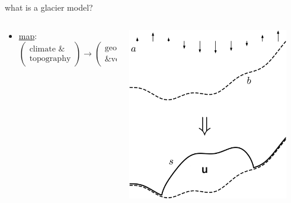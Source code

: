 \documentclass[svgnames,
               hyperref={colorlinks,citecolor=DeepPink4,linkcolor=FireBrick,urlcolor=Maroon},
               usepdftitle=false]  %
               {beamer}
\begin{document}
\begin{frame}{what is a glacier model?}
\begin{columns}
\begin{column}{0.6\textwidth}
\begin{itemize}
\smallskip
\item<2> {\small \underline{map}: \, $\begin{pmatrix} \text{climate \&} \\ \text{topography} \end{pmatrix} \to \begin{pmatrix} \text{geometry} \\ \text{\& velocity} \end{pmatrix}$ }
\end{itemize}
\end{column}
\begin{column}{0.42\textwidth}
\hfill \includegraphics[width=0.9\textwidth]{../images/map-velocity.png}

\vspace{2mm}
\end{column}
\end{columns}
\end{frame}
\end{document}
